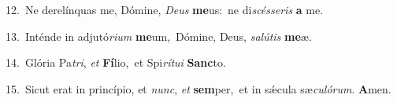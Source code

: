 {\numbfont\textcolor{\numbcolor}{12.}}~Ne derelínquas me, Dómine, \textit{De}\-\textit{us} \textbf{me}\-us:~\star ne di\-\textit{scés}\-\textit{se}\textit{ris} \textbf{a} me.\par
{\numbfont\textcolor{\numbcolor}{13.}}~Inténde in adjutó\-\textit{ri}\-\textit{um} \textbf{me}\-um,~\star Dómine, Deus, \textit{sa}\-\textit{lú}\textit{tis} \textbf{me}\-æ.\par
{\numbfont\textcolor{\numbcolor}{14.}}~Glória Pa\-\textit{tri}\-, \textit{et} \textbf{Fí}\-lio,~\star et Spi\-\textit{rí}\-\textit{tu}\textit{i} \textbf{Sanc}\-to.\par
{\numbfont\textcolor{\numbcolor}{15.}}~Sicut erat in princípio, et \textit{nunc}\-, \textit{et} \textbf{sem}\-per,~\star et in sǽcula sæ\-\textit{cu}\-\textit{ló}\textit{rum}. \textbf{A}\-men.\par
